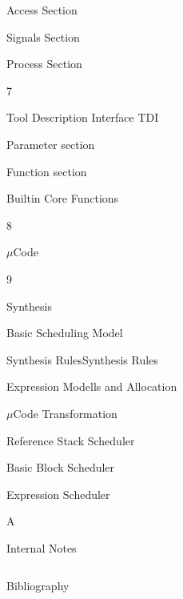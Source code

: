 \def\tocXCVIII{Access Section}
{\bf{\parbox{0.95\textwidth}{\hskip10pt\tocXCVIII\dotfill\pageref{toclabelXCVIII}}}}\vskip5pt

\def\tocXCIX{Signals Section}
{\bf{\parbox{0.95\textwidth}{\hskip10pt\tocXCIX\dotfill\pageref{toclabelXCIX}}}}\vskip5pt

\def\tocC{Process Section}
{\bf{\parbox{0.95\textwidth}{\hskip10pt\tocC\dotfill\pageref{toclabelC}}}}\vskip5pt

\def\tocCI{Tool Description Interface TDI}
{\vskip5pt\bf\large\hskip-30pt\parbox{30pt}{ 7}\parbox{0.95\textwidth}{\tocCI\dotfill\pageref{toclabelCI}}}\vskip10pt

\def\tocCII{Parameter section }
{\bf{\parbox{0.95\textwidth}{\hskip10pt\tocCII\dotfill\pageref{toclabelCII}}}}\vskip5pt

\def\tocCIII{Function section }
{\bf{\parbox{0.95\textwidth}{\hskip10pt\tocCIII\dotfill\pageref{toclabelCIII}}}}\vskip5pt

\def\tocCIV{Builtin Core Functions }
{\bf{\parbox{0.95\textwidth}{\hskip10pt\tocCIV\dotfill\pageref{toclabelCIV}}}}\vskip5pt

\def\tocCV{\texorpdfstring{$\mu$}{\textmu}Code}
{\vskip5pt\bf\large\hskip-30pt\parbox{30pt}{ 8}\parbox{0.95\textwidth}{\tocCV\dotfill\pageref{toclabelCV}}}\vskip10pt

\def\tocCVI{Synthesis}
{\vskip5pt\bf\large\hskip-30pt\parbox{30pt}{ 9}\parbox{0.95\textwidth}{\tocCVI\dotfill\pageref{toclabelCVI}}}\vskip10pt

\def\tocCVII{Basic Scheduling Model}
{\bf{\parbox{0.95\textwidth}{\hskip10pt\tocCVII\dotfill\pageref{toclabelCVII}}}}\vskip5pt

\def\tocCVIII{Synthesis RulesSynthesis Rules}
{\bf{\parbox{0.95\textwidth}{\hskip10pt\tocCVIII\dotfill\pageref{toclabelCVIII}}}}\vskip5pt

\def\tocCIX{Expression Modells and Allocation}
{\bf{\parbox{0.95\textwidth}{\hskip10pt\tocCIX\dotfill\pageref{toclabelCIX}}}}\vskip5pt

\def\tocCX{\texorpdfstring{$\mu$}{\textmu}Code Transformation}
{\bf{\parbox{0.95\textwidth}{\hskip10pt\tocCX\dotfill\pageref{toclabelCX}}}}\vskip5pt

\def\tocCXI{Reference Stack Scheduler}
{\bf{\parbox{0.95\textwidth}{\hskip10pt\tocCXI\dotfill\pageref{toclabelCXI}}}}\vskip5pt

\def\tocCXII{Basic Block Scheduler}
{\bf{\parbox{0.95\textwidth}{\hskip10pt\tocCXII\dotfill\pageref{toclabelCXII}}}}\vskip5pt

\def\tocCXIII{Expression Scheduler}
{\bf{\parbox{0.95\textwidth}{\hskip10pt\tocCXIII\dotfill\pageref{toclabelCXIII}}}}\vskip5pt

\def\tocAPPI{Internal Notes}
{\vskip5pt\bf\large\hskip-30pt\parbox{30pt}{ A}\parbox{0.95\textwidth}{\tocAPPI\dotfill\pageref{toclabelAPPI}}}\vskip10pt

\def\tocBIB{Bibliography}
{\vskip5pt\bf\large\hskip-30pt\parbox{30pt}{$ $}\parbox{0.95\textwidth}{\tocBIB\dotfill\pageref{toclabelBIB}}}\vskip10pt
\newpage
